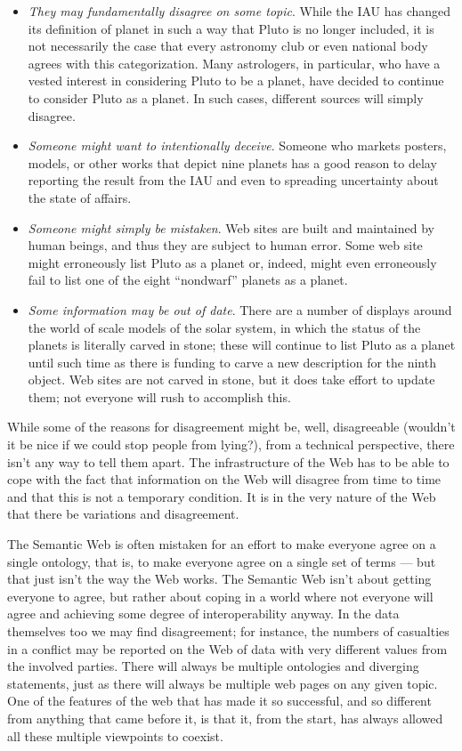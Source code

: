 \begin{itemize}
\item
  \emph{They may fundamentally disagree on some topic}. While the IAU
  has changed its definition of planet in such a way that Pluto is no
  longer included, it is not necessarily the case that every astronomy
  club or even national body agrees with this categorization. Many
  astrologers, in particular, who have a vested interest in considering
  Pluto to be a planet, have decided to continue to consider Pluto as a
  planet. In such cases, different sources will simply disagree.
\item
  \emph{Someone might want to intentionally deceive}. Someone who
  markets posters, models, or other works that depict nine planets has a
  good reason to delay reporting the result from the IAU and even to
  spreading uncertainty about the state of affairs.
\item
  \emph{Someone might simply be mistaken}. Web sites are built and
  maintained by human beings, and thus they are subject to human error.
  Some web site might erroneously list Pluto as a planet or, indeed,
  might even erroneously fail to list one of the eight ``nondwarf''
  planets as a planet.
\item
  \emph{Some information may be out of date}. There are a number of
  displays around the world of scale models of the solar system, in
  which the status of the planets is literally carved in stone; these
  will continue to list Pluto as a planet until such time as there is
  funding to carve a new description for the ninth object. Web sites are
  not carved in stone, but it does take effort to update them; not
  everyone will rush to accomplish this.
\end{itemize}


While some of the reasons for disagreement might be, well, disagreeable
(wouldn't it be nice if we could stop people from lying?), from a technical 
perspective, 
there isn't any way to tell them apart. The infrastructure of the Web
has to be able to cope with the fact that information on the Web will
disagree from time to time and that this is not a temporary condition.
It is in the very nature of the Web that there be variations and
disagreement.

The Semantic Web is often mistaken for an effort to make everyone agree
on a single ontology, that is, to make everyone agree on a single set of terms  
--- but that just isn't the way the Web works. The
Semantic Web isn't about getting everyone to agree, but rather about
coping in a world where not everyone will agree and achieving some
degree of interoperability anyway. In the data themselves too we may
find disagreement; for instance, the numbers of casualties in a conflict
may be reported on the Web of data with very different values from the
involved parties. There will always be multiple ontologies and diverging
statements, just as there will always be multiple web pages on any given
topic.  One of the features of the web that has made it so successful, and so
different from anything that came before it, is that it, from the start, has 
always allowed  all these multiple
viewpoints to coexist.

